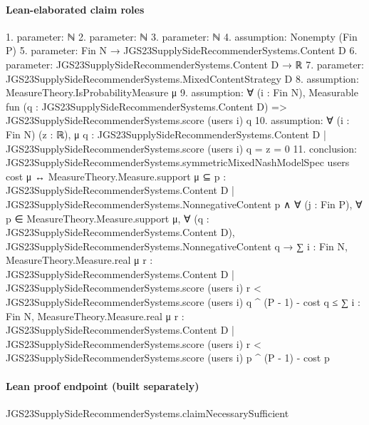 \documentclass[10pt]{article}
\begin{document}
\paragraph{Lean-elaborated claim roles}\begin{ReviewVerbatim}
1. parameter: ℕ
2. parameter: ℕ
3. parameter: ℕ
4. assumption: Nonempty (Fin P)
5. parameter: Fin N → JGS23SupplySideRecommenderSystems.Content D
6. parameter: JGS23SupplySideRecommenderSystems.Content D → ℝ
7. parameter: JGS23SupplySideRecommenderSystems.MixedContentStrategy D
8. assumption: MeasureTheory.IsProbabilityMeasure μ
9. assumption: ∀ (i : Fin N),
  Measurable fun (q : JGS23SupplySideRecommenderSystems.Content D) =>
    JGS23SupplySideRecommenderSystems.score (users i) q
10. assumption: ∀ (i : Fin N) (z : ℝ),
  μ {q : JGS23SupplySideRecommenderSystems.Content D | JGS23SupplySideRecommenderSystems.score (users i) q = z} = 0
11. conclusion: JGS23SupplySideRecommenderSystems.symmetricMixedNashModelSpec users cost μ ↔
  MeasureTheory.Measure.support μ ⊆
      {p : JGS23SupplySideRecommenderSystems.Content D | JGS23SupplySideRecommenderSystems.NonnegativeContent p} ∧
    ∀ (j : Fin P),
      ∀ p ∈ MeasureTheory.Measure.support μ,
        ∀ (q : JGS23SupplySideRecommenderSystems.Content D),
          JGS23SupplySideRecommenderSystems.NonnegativeContent q →
            ∑ i : Fin N,
                  MeasureTheory.Measure.real μ
                      {r : JGS23SupplySideRecommenderSystems.Content D |
                        JGS23SupplySideRecommenderSystems.score (users i) r <
                          JGS23SupplySideRecommenderSystems.score (users i) q} ^
                    (P - 1) -
                cost q ≤
              ∑ i : Fin N,
                  MeasureTheory.Measure.real μ
                      {r : JGS23SupplySideRecommenderSystems.Content D |
                        JGS23SupplySideRecommenderSystems.score (users i) r <
                          JGS23SupplySideRecommenderSystems.score (users i) p} ^
                    (P - 1) -
                cost p
\end{ReviewVerbatim}

\paragraph{Lean proof endpoint (built separately)}\begin{ReviewVerbatim}
JGS23SupplySideRecommenderSystems.claimNecessarySufficient
\end{ReviewVerbatim}
\end{document}
